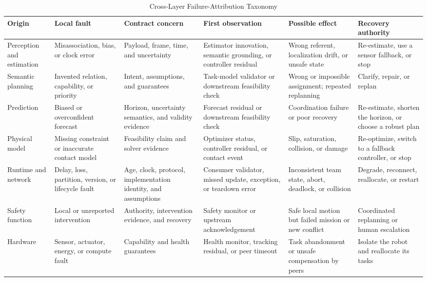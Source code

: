 \begin{table}[!t]
  \centering
  \caption{Cross-Layer Failure-Attribution Taxonomy}
  \label{tab:attribution}
  \scriptsize
  \setlength{\tabcolsep}{3pt}
  \renewcommand{\arraystretch}{1.08}
  \begin{tabularx}{\textwidth}{@{}P{0.11\textwidth}P{0.15\textwidth}P{0.15\textwidth}YP{0.16\textwidth}P{0.15\textwidth}@{}}
    \toprule
    Origin & Local fault & Contract concern & First observation & Possible effect & Recovery authority \\
    \midrule
    Perception and estimation
      & Misassociation, bias, or clock error
      & Payload, frame, time, and uncertainty
      & Estimator innovation, semantic grounding, or controller residual
      & Wrong referent, localization drift, or unsafe state
      & Re-estimate, use a sensor fallback, or stop \\
    Semantic planning
      & Invented relation, capability, or priority
      & Intent, assumptions, and guarantees
      & Task-model validator or downstream feasibility check
      & Wrong or impossible assignment; repeated replanning
      & Clarify, repair, or replan \\
    Prediction
      & Biased or overconfident forecast
      & Horizon, uncertainty semantics, and validity evidence
      & Forecast residual or downstream feasibility check
      & Coordination failure or poor recovery
      & Re-estimate, shorten the horizon, or choose a robust plan \\
    Physical model
      & Missing constraint or inaccurate contact model
      & Feasibility claim and solver evidence
      & Optimizer status, controller residual, or contact event
      & Slip, saturation, collision, or damage
      & Re-optimize, switch to a fallback controller, or stop \\
    Runtime and network
      & Delay, loss, partition, version, or lifecycle fault
      & Age, clock, protocol, implementation identity, and assumptions
      & Consumer validator, missed update, exception, or teardown error
      & Inconsistent team state, abort, deadlock, or collision
      & Degrade, reconnect, reallocate, or restart \\
    Safety function
      & Local or unreported intervention
      & Authority, intervention evidence, and recovery
      & Safety monitor or upstream acknowledgement
      & Safe local motion but failed mission or new conflict
      & Coordinated replanning or human escalation \\
    Hardware
      & Sensor, actuator, energy, or compute fault
      & Capability and health guarantees
      & Health monitor, tracking residual, or peer timeout
      & Task abandonment or unsafe compensation by peers
      & Isolate the robot and reallocate its tasks \\
    \bottomrule
  \end{tabularx}
\end{table}
